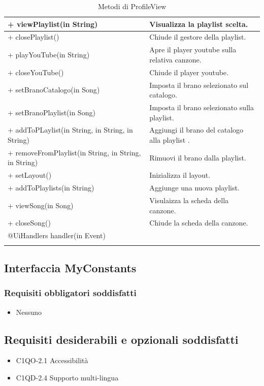\begin{longtable}{|p{}|p{}|}
+ viewPlaylist(in String) & Visualizza la playlist scelta.\\\hline
+ closePlaylist() & Chiude il gestore della playlist.\\\hline
+ playYouTube(in String) & Apre il player youtube sulla relativa
canzone.\\\hline 
+ closeYouTube() & Chiude il player youtube.\\\hline
+ setBranoCatalogo(in Song) & Imposta il brano selezionato sul catalogo.\\\hline
+ setBranoPlaylist(in Song) & Imposta il brano selezionato sulla
playlist.\\\hline 
+ addToPLaylist(in String, in String, in String) & Aggiungi il brano del
catalogo alla playlist .\\\hline 
+ removeFromPlaylist(in String, in String, in String) & Rimuovi il brano dalla
playlist.\\\hline 
+ setLayout() & Inizializza il layout.\\\hline
+ addToPlaylists(in String) & Aggiunge una nuova playlist.\\\hline 
+ viewSong(in Song) & Visulaizza la scheda della canzone.\\\hline
+ closeSong() & Chiude la scheda della canzone.\\\hline
@UiHandlers handler(in Event) & \\\hline
\caption{Metodi di ProfileView}
\end{longtable}

\subsection{Interfaccia MyConstants}
\subsubsection*{Requisiti obbligatori soddisfatti}
\begin{itemize}
    \item Nessuno
\end{itemize}
\subsection*{Requisiti desiderabili e opzionali soddisfatti}
\begin{itemize}
    \item C1QO-2.1 Accessibilit\`a
    \item C1QD-2.4 Supporto multi-lingua
\end{itemize}
